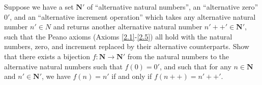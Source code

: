 \begin{exercise}\label{ex 3.5.13}
Suppose we have a set \(\mathbf{N}'\) of ``alternative natural numbers'', an ``alternative zero'' \(0'\), and an ``alternative increment operation'' which takes any alternative natural number \(n' \in N\) and returns another alternative natural number \(n'++' \in \mathbf{N}'\), such that the Peano axioms (Axioms \ref{2.1}-\ref{2.5}) all hold with the natural numbers, zero, and increment replaced by their alternative counterparts.
Show that there exists a bijection \(f : \mathbf{N} \to \mathbf{N}'\) from the natural numbers to the alternative natural numbers such that \(f(0) = 0'\), and such that for any \(n \in \mathbf{N}\) and \(n' \in \mathbf{N}'\), we have \(f(n) = n'\) if and only if \(f(n++) = n'++'\).
\end{exercise}

